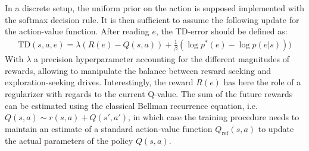 \documentclass[runningheads]{llncs}
\begin{document}
In a discrete setup, the uniform prior on the action is supposed implemented with the softmax decision rule. It is then sufficient to assume the following update for the action-value function.
After reading $e$, %
the TD-error should be defined as:
\begin{align}\label{eq:var-RL-lambda}
\text{TD}(s,a,e) = \lambda(R(e) - Q(s,a)) + \frac{1}{\beta} (\log p^*(e) - \log p(e|s)))
\end{align}
With $\lambda$ a precision hyperparameter accounting for the different magnitudes of rewards, allowing to manipulate the balance between reward seeking and exploration-seeking drives.
Interestingly, the reward $R(e)$ has here the role of a regularizer with regards to the current Q-value. The sum of the future rewards can be estimated using the classical Bellman recurrence equation, i.e. $Q(s,a) \sim r(s,a) + Q(s', a')$, in which case the training procedure needs to maintain an estimate of a standard action-value function $Q_\text{ref}(s,a)$ to update the actual parameters of the policy $Q(s,a)$.  








\end{document}
